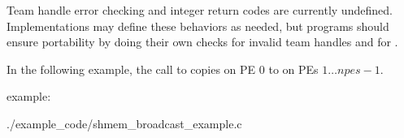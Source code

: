\begin{apidefinition}
{    Team handle error checking and integer return codes are currently undefined.
    Implementations may define these behaviors as needed, but programs should
    ensure portability by doing their own checks for invalid team handles and for
    .
}

\begin{apiexamples}

\apicexample
    {In the following example, the call to  copies \source{}
    on \ac{PE} $0$ to \dest{} on \acp{PE} $1\dots npes-1$.
    
    \CorCpp{} example:}
    {./example_code/shmem_broadcast_example.c}
    {}

\end{apiexamples}

\end{apidefinition}

